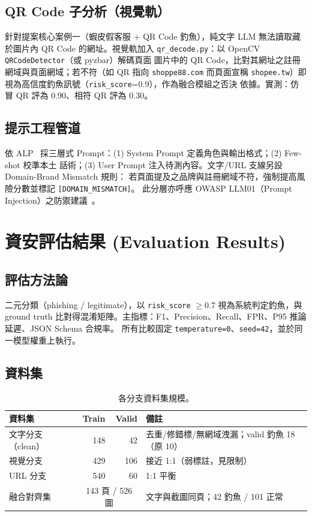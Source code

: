 \documentclass[11pt]{ctexart}
\begin{document}
\subsection{QR Code 子分析（視覺軌）}
針對提案核心案例一（蝦皮假客服 + QR Code 釣魚），純文字 LLM 無法讀取藏於圖片內 QR Code
的網址。視覺軌加入 \texttt{qr\_decode.py}：以 OpenCV \texttt{QRCodeDetector}（或 pyzbar）解碼頁面
圖片中的 QR Code，比對其網址之註冊網域與頁面網域；若不符（如 QR 指向 \texttt{shoppe88.com}
而頁面宣稱 \texttt{shopee.tw}）即視為高信度釣魚訊號（\texttt{risk\_score}=0.9），作為融合模組之否決
依據。實測：仿冒 QR 評為 0.90、相符 QR 評為 0.30。

\subsection{提示工程管道}
依 ALP~\cite{alp2025} 採三層式 Prompt：(1) System Prompt 定義角色與輸出格式；(2) Few-shot 校準本土
話術；(3) User Prompt 注入待測內容。文字/URL 支線另設 Domain-Brand Mismatch 規則：
若頁面提及之品牌與註冊網域不符，強制提高風險分數並標記 \texttt{[DOMAIN\_MISMATCH]}。
此分層亦呼應 OWASP LLM01（Prompt Injection）之防禦建議~\cite{owasp2025}。

\section{資安評估結果 (Evaluation Results)}

\subsection{評估方法論}
二元分類（phishing / legitimate），以 \texttt{risk\_score} $\ge 0.7$ 視為系統判定釣魚，與 ground
truth 比對得混淆矩陣。主指標：F1、Precision、Recall、FPR、P95 推論延遲、JSON Schema 合規率。
所有比較固定 \texttt{temperature=0}、\texttt{seed=42}，並於同一模型權重上執行。

\subsection{資料集}
\begin{table}[h]
\centering
\begin{tabular}{lrrl}
\toprule
\textbf{資料集} & \textbf{Train} & \textbf{Valid} & \textbf{備註} \\
\midrule
文字分支（clean） & 148 & 42 & 去重/修錯標/無網域洩漏；valid 釣魚 18（原 10）\\
視覺分支 & 429 & 106 & 接近 1:1（弱標註，見限制）\\
URL 分支 & 540 & 60 & 1:1 平衡 \\
融合對齊集 & \multicolumn{2}{c}{143 頁 / 526 圖} & 文字與截圖同頁；42 釣魚 / 101 正常 \\
\bottomrule
\end{tabular}
\caption{各分支資料集規模。}
\end{table}
\end{document}
